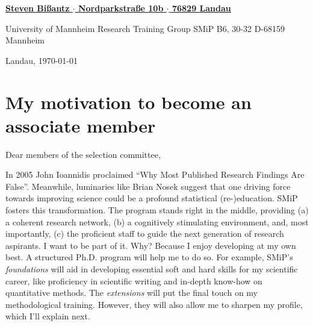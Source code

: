 \documentclass[11pt]{FreemanML}
\begin{document}
\begin{paracol}{2}

\switchcolumn %

\color{headings} 
\vspace{2cm}
\underline{\textbf{\footnotesize{Steven Bißantz $\cdot$ Nordparkstraße 10b $\cdot$ 76829 Landau}}}

\color{text}
\bigskip
\begin{leftbar}
University of Mannheim \newline
Research Training Group SMiP \newline
B6, 30-32 \newline
D-68159 Mannheim
\end{leftbar}

\switchcolumn

\vspace{5cm}
\begin{flushright}
Landau, \today
\end{flushright}
\end{paracol} %

\vspace{1cm}
\section*{My motivation to become an associate member}
\bigskip
Dear members of the selection committee,
\smallskip

\onehalfspacing

\lettrine[lines=3]{I}{}n 2005 John Ioannidis proclaimed \enquote{Why Most
Published Research Findings Are False}. Meanwhile, luminaries like Brian Nosek
suggest that one driving force towards improving science could be a profound
statistical (re-)education. SMiP fosters this transformation. The program
stands right in the middle, providing (a) a coherent research network, (b) a
cognitively stimulating environment, and, most importantly, (c) the proficient
staff to guide the next generation of research aspirants. I want to be part of
it. Why? Because I enjoy developing at my own best. A structured Ph.D. program
will help me to do so. For example, SMiP's \textit{foundations} will aid in
developing essential soft and hard skills for my scientific career, like
proficiency in scientific writing and in-depth know-how on quantitative
methods. The \textit{extensions} will put the final touch on my methodological
training. However, they will also allow me to sharpen my profile, which I'll
explain next. 
\end{document}
